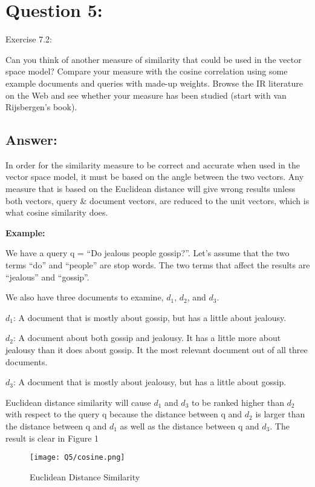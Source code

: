 \section*{Question 5:}
Exercise 7.2: 

Can you think of another measure of similarity that could be used in the vector space model? Compare your measure with the cosine correlation using some example documents and queries with made-up weights. Browse the IR literature on the Web and see whether your measure has been studied (start with van Rijsbergen’s book).

\subsection*{Answer:}

In order for the similarity measure to be correct and accurate when used in the vector space model, it must be based on the angle between the two vectors. Any measure that is based on the Euclidean distance will give wrong results unless both vectors, query \& document vectors, are reduced to the unit vectors, which is what cosine similarity does.

\textbf{Example:}

We have a query q = ``Do jealous people gossip?''. Let's assume that the two terms ``do'' and ``people'' are stop words. The two terms that affect the results are ``jealous'' and ``gossip''.

We also have three documents to examine, $d_1$, $d_2$, and $d_3$.

$d_1$: A document that is mostly about gossip, but has a little about jealousy.

$d_2$: A document about both gossip and jealousy. It has a little more about jealousy than it does about gossip. It the most relevant document out of all three documents.

$d_3$: A document that is mostly about jealousy, but has a little about gossip.

Euclidean distance similarity will cause $d_1$ and $d_3$ to be ranked higher than $d_2$ with respect to the query q because the distance between q and $d_2$ is larger than the distance between q and $d_1$ as well as the distance between q and $d_3$. The result is clear in Figure 1

\begin{figure}[h]
\caption{Euclidean Distance Similarity}
\centering
\texttt{[image: Q5/cosine.png]}
\end{figure}


